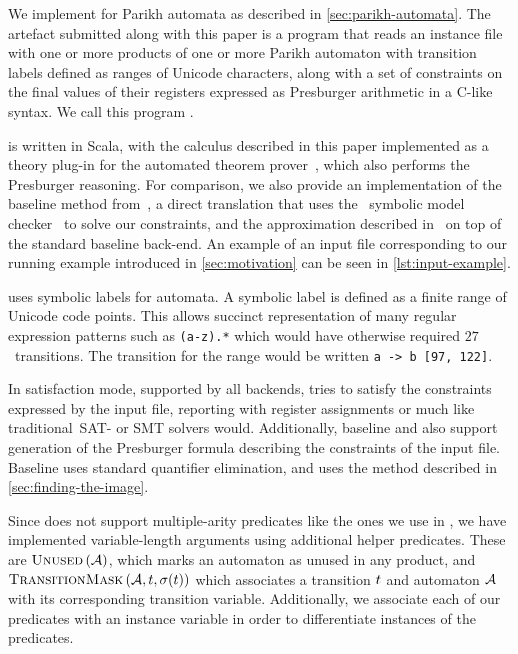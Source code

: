 
We implement \Calculus{} for Parikh automata as described in
\cref{sec:parikh-automata}. The artefact submitted along with this paper is a
program that reads an instance file with one or more products of one or more
Parikh automaton with transition labels defined as ranges of Unicode characters,
along with a set of constraints on the final values of their registers expressed
as Presburger arithmetic in a C-like syntax. We call this program
\Catra.

\Catra{} is written in Scala, with the calculus described in this paper
implemented as a theory plug-in for the \Princess{} automated theorem
prover~\cite{princess}, which also performs the Presburger reasoning. For
comparison, we also provide an implementation of the baseline method
from~\cite{generate-parikh-image}, a direct translation that uses the~\Nuxmv{}
symbolic model checker~\cite{nuxmv} to solve our constraints, and the
approximation described in~\cite{approximate-parikh} on top of the standard
baseline back-end. An example of an input file corresponding to our running
example introduced in \cref{sec:motivation} can be seen in
\cref{lst:input-example}.

\Catra{} uses symbolic labels for automata. A symbolic label is defined as a
finite range of Unicode code points. This allows succinct representation of many
regular expression patterns such as \lstinline{(a-z).*} which would have
otherwise required $27$~transitions. The transition for the range would be
written \lstinline{a -> b [97, 122]}.

In satisfaction mode, supported by all backends, \Catra{} tries to satisfy the
constraints expressed by the input file, reporting \Sat{} with register
assignments or \Unsat{} much like traditional~SAT- or SMT solvers would.
Additionally, baseline and \Calculus{} also support generation of the Presburger
formula describing the constraints of the input file. Baseline uses standard
quantifier elimination, and \Calculus{} uses the method described in
\cref{sec:finding-the-image}.

Since \Princess{} does not support multiple-arity predicates like the ones we
use in \Calculus{}, we have implemented variable-length arguments using
additional helper predicates. These are $\operatorname{\textsc{Unused}}{}(\mathcal{A})$, which marks an
automaton as unused in any product, and $\operatorname{\textsc{TransitionMask}}{}(\mathcal{A},
t, \operatorname{\sigma}(t))$ which associates a transition $t$
and automaton $\mathcal{A}$ with its corresponding transition variable.
Additionally, we associate each of our predicates with an instance variable in
order to differentiate instances of the predicates.


